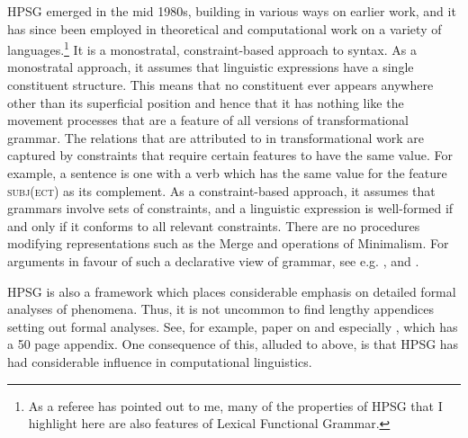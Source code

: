 \documentclass[output=paper]{langsci/langscibook}
\begin{document}
\gls{HPSG} emerged in the mid 1980s, building in various ways on earlier work,
and it has since been employed in theoretical and computational work on a
variety of languages.\footnote{As a referee has pointed out to me, many of the
    properties of \gls{HPSG} that I highlight here are also features of Lexical
Functional Grammar.} It is a monostratal, constraint-based approach to syntax.
As a monostratal approach, it assumes that linguistic expressions have a single
constituent structure. This means that no constituent ever appears anywhere
other than its superficial position and hence that it has nothing like the
movement processes that are a feature of all versions of transformational
grammar. The relations that are attributed to  in transformational work
are captured by constraints that require certain features to have the same
value. For example, a  sentence is one with a verb which has the same
value for the feature \textsc{subj(ect)} as its complement. As a constraint-based
approach, it assumes that grammars involve sets of constraints, and a
linguistic expression is well-formed if and only if it conforms to all relevant
constraints. There are no procedures modifying representations such as the
Merge and  operations of Minimalism. For arguments in favour of such a
declarative view of grammar, see e.g. \citet{PulScho2001}, \citet{Postal2003}
and \textcite{SagWas2011,SagWas2015}.

\gls{HPSG} is also a framework which places considerable emphasis on detailed
formal analyses of phenomena. Thus, it is not uncommon to find lengthy
appendices setting out formal analyses. See, for example, 
paper on   and especially \citet{GinSag2000}, which has
a 50 page appendix. One consequence of this, alluded to above, is that
\gls{HPSG} has had considerable influence in computational linguistics.
\end{document}
